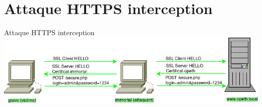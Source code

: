 \documentclass{beamer}
\begin{document}
\section{Attaque HTTPS interception}
\begin{frame}{Attaque HTTPS interception}
    \includegraphics[scale=0.4]{../medias/https-interception/attack.png}
\end{frame}
\end{document}
